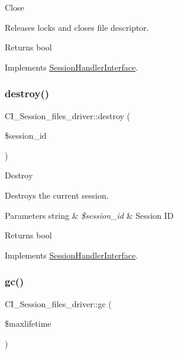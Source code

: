 Close

Releases locks and closes file descriptor.

\begin{DoxyReturn}{Returns}
bool 
\end{DoxyReturn}


Implements \mbox{\hyperlink{interface_session_handler_interface}{Session\+Handler\+Interface}}.

\mbox{\label{class_c_i___session__files__driver_a6a57b41c390e04a7af89e31b13b1ba60}} 
\subsubsection{\texorpdfstring{destroy()}{destroy()}}
{\footnotesize\ttfamily C\+I\+\_\+\+Session\+\_\+files\+\_\+driver\+::destroy (\begin{DoxyParamCaption}\item[{}]{\$session\+\_\+id }\end{DoxyParamCaption})}

Destroy

Destroys the current session.


\begin{DoxyParams}[1]{Parameters}
string & {\em \$session\+\_\+id} & Session ID \\
\hline
\end{DoxyParams}
\begin{DoxyReturn}{Returns}
bool 
\end{DoxyReturn}


Implements \mbox{\hyperlink{interface_session_handler_interface}{Session\+Handler\+Interface}}.

\mbox{\label{class_c_i___session__files__driver_aede798f406b1aa4c059f5da7ec72c4a7}} 
\subsubsection{\texorpdfstring{gc()}{gc()}}
{\footnotesize\ttfamily C\+I\+\_\+\+Session\+\_\+files\+\_\+driver\+::gc (\begin{DoxyParamCaption}\item[{}]{\$maxlifetime }\end{DoxyParamCaption})}

